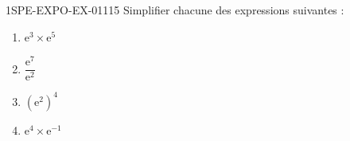 \begin{exercice}{1SPE-EXPO-EX-011}{1}{5}
Simplifier chacune des expressions suivantes :
\begin{enumerate}
  \item $\mathrm{e}^3 \times \mathrm{e}^5$
  \item $\dfrac{\mathrm{e}^7}{\mathrm{e}^2}$
  \item $\left(\mathrm{e}^2\right)^4$
  \item $\mathrm{e}^4 \times \mathrm{e}^{-1}$
\end{enumerate}
\end{exercice}
